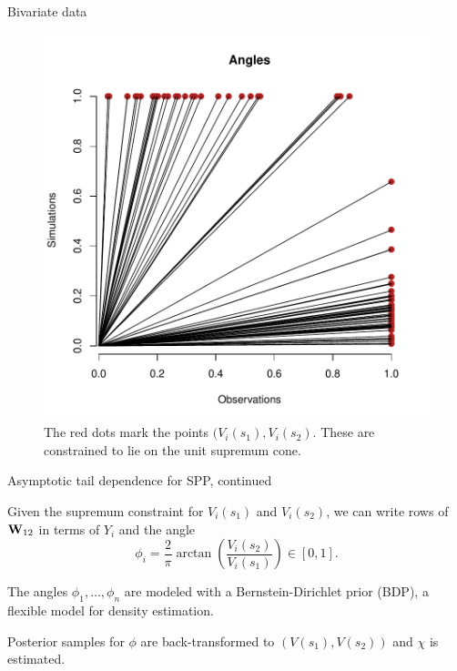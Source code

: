 \documentclass[mathserif, 11pt, t]{beamer}
\begin{document}
\begin{frame}{Bivariate data}
\begin{figure}
\begin{center}
\includegraphics[scale=0.34]{figs/biv_cone.pdf}
\end{center}
\caption{The red dots mark the points $(V_i(s_1), V_i(s_2)$. These are constrained to lie on the unit supremum cone.}
\end{figure}
\end{frame}

\begin{frame}{Asymptotic tail dependence for SPP, continued}

Given the supremum constraint for $V_i(s_1)$ and $V_i(s_2)$, we can write rows of $\mathbf{\bm{W}}_{12}$ in terms of $Y_i$ and the angle
\[ \phi_i = \frac{2}{\pi}\arctan\left(\frac{V_i(s_2)}{V_i(s_1)}\right)\in[0,1]. \]

The angles $\phi_1,\ldots,\phi_n$ are modeled with a Bernstein-Dirichlet prior (BDP), a flexible model for density estimation.
\bigskip

Posterior samples for $\phi$ are back-transformed to $(V(s_1), V(s_2))$ and $\chi$ is estimated.

\end{frame}
\end{document}
